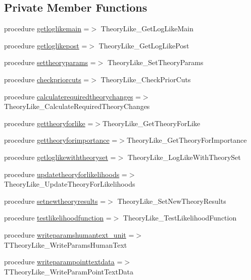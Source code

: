 \subsection*{Private Member Functions}
\begin{DoxyCompactItemize}
\item 
procedure \mbox{\hyperlink{structcalclike_1_1ttheorylikecalculator_ad8ebfaf2da323712f07665f2c0ae22f1}{getloglikemain}} =$>$ Theory\+Like\+\_\+\+Get\+Log\+Like\+Main
\item 
procedure \mbox{\hyperlink{structcalclike_1_1ttheorylikecalculator_acec9ba66259574173981e2379c967d3d}{getloglikepost}} =$>$ Theory\+Like\+\_\+\+Get\+Log\+Like\+Post
\item 
procedure \mbox{\hyperlink{structcalclike_1_1ttheorylikecalculator_a462577931f06c2e286af8fa31b989418}{settheoryparams}} =$>$ Theory\+Like\+\_\+\+Set\+Theory\+Params
\item 
procedure \mbox{\hyperlink{structcalclike_1_1ttheorylikecalculator_ab199ca08e527ebe3c59b847ad46c8a7f}{checkpriorcuts}} =$>$ Theory\+Like\+\_\+\+Check\+Prior\+Cuts
\item 
procedure \mbox{\hyperlink{structcalclike_1_1ttheorylikecalculator_a13a9f0107ef904796cac4ddd95a5b86d}{calculaterequiredtheorychanges}} =$>$Theory\+Like\+\_\+\+Calculate\+Required\+Theory\+Changes
\item 
procedure \mbox{\hyperlink{structcalclike_1_1ttheorylikecalculator_a3d9191e0b3a895b667de7ae56a1c7c22}{gettheoryforlike}} =$>$Theory\+Like\+\_\+\+Get\+Theory\+For\+Like
\item 
procedure \mbox{\hyperlink{structcalclike_1_1ttheorylikecalculator_ace0e1a26b9742b7c644a65839b8644ef}{gettheoryforimportance}} =$>$Theory\+Like\+\_\+\+Get\+Theory\+For\+Importance
\item 
procedure \mbox{\hyperlink{structcalclike_1_1ttheorylikecalculator_a76102172085582df8b4ed001e719f1d0}{getloglikewiththeoryset}} =$>$ Theory\+Like\+\_\+\+Log\+Like\+With\+Theory\+Set
\item 
procedure \mbox{\hyperlink{structcalclike_1_1ttheorylikecalculator_abdc93513e658fb7cc8ef130b76f715f5}{updatetheoryforlikelihoods}} =$>$ Theory\+Like\+\_\+\+Update\+Theory\+For\+Likelihoods
\item 
procedure \mbox{\hyperlink{structcalclike_1_1ttheorylikecalculator_afb037ba9de9f904a91a9c699e22e63f8}{setnewtheoryresults}} =$>$ Theory\+Like\+\_\+\+Set\+New\+Theory\+Results
\item 
procedure \mbox{\hyperlink{structcalclike_1_1ttheorylikecalculator_a95c0795a7bbe7e644a5e74945c6b8f77}{testlikelihoodfunction}} =$>$ Theory\+Like\+\_\+\+Test\+Likelihood\+Function
\item 
procedure \mbox{\hyperlink{structcalclike_1_1ttheorylikecalculator_aad0526bf1e999cbd58ecf34fc5d7de73}{writeparamshumantext\+\_\+unit}} =$>$ T\+Theory\+Like\+\_\+\+Write\+Params\+Human\+Text
\item 
procedure \mbox{\hyperlink{structcalclike_1_1ttheorylikecalculator_ae0da735e0213268e248c688b50d4d0c9}{writeparampointtextdata}} =$>$ T\+Theory\+Like\+\_\+\+Write\+Param\+Point\+Text\+Data
\end{DoxyCompactItemize}
